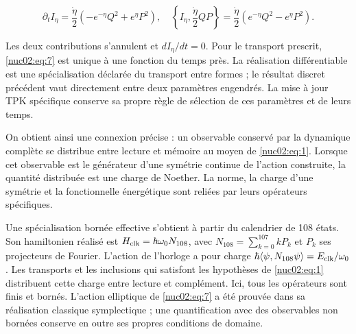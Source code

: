 \[
\partial_tI_\eta=\frac{\dot\eta}{2}(-e^{-\eta}Q^2+e^\eta P^2),
\quad
\left\{I_\eta,\frac{\dot\eta}{2}QP\right\}
=\frac{\dot\eta}{2}(e^{-\eta}Q^2-e^\eta P^2).
\]

Les deux contributions s’annulent et \(dI_\eta/dt=0\). Pour le transport prescrit, \eqref{nuc02:eq:7} est unique à une fonction du temps près. La réalisation différentiable est une spécialisation déclarée du transport entre formes ; le résultat discret précédent vaut directement entre deux paramètres engendrés. La mise à jour TPK spécifique conserve sa propre règle de sélection de ces paramètres et de leurs temps.

On obtient ainsi une connexion précise : un observable conservé par la dynamique complète se distribue entre lecture et mémoire au moyen de \eqref{nuc02:eq:1}. Lorsque cet observable est le générateur d’une symétrie continue de l’action construite, la quantité distribuée est une charge de Noether. La norme, la charge d’une symétrie et la fonctionnelle énergétique sont reliées par leurs opérateurs spécifiques.

Une spécialisation bornée effective s’obtient à partir du calendrier de 108 états. Son hamiltonien réalisé est \(H_{\rm clk}=\hbar\omega_0N_{108}\), avec \(N_{108}=\sum_{k=0}^{107}kP_k\) et \(P_k\) ses projecteurs de Fourier. L’action de l’horloge a pour charge \(\hbar\langle\psi,N_{108}\psi\rangle=E_{\rm clk}/\omega_0\). Les transports et les inclusions qui satisfont les hypothèses de \eqref{nuc02:eq:1} distribuent cette charge entre lecture et complément. Ici, tous les opérateurs sont finis et bornés. L’action elliptique de \eqref{nuc02:eq:7} a été prouvée dans sa réalisation classique symplectique ; une quantification avec des observables non bornées conserve en outre ses propres conditions de domaine.


